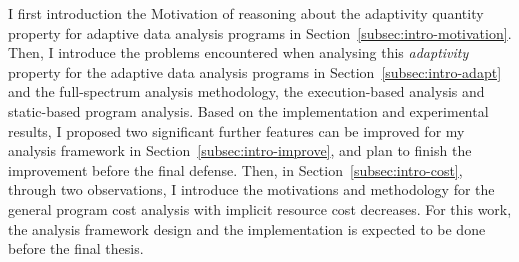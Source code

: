 I first introduction the Motivation of reasoning about the adaptivity quantity property for adaptive data analysis programs in Section~\ref{subsec:intro-motivation}.
Then, I introduce the problems encountered when analysing this \emph{adaptivity} property for the adaptive data analysis programs in Section~\ref{subsec:intro-adapt}
and the full-spectrum analysis methodology, the execution-based analysis and static-based program analysis.
%
Based on the implementation and experimental results, I proposed two significant 
further features can be improved for my analysis framework in Section~\ref{subsec:intro-improve}, and plan to finish the improvement 
before the final defense.
%
   Then, in Section~\ref{subsec:intro-cost}, through two observations, I introduce the motivations and methodology
   for the general program cost analysis with implicit resource cost decreases.
   For this work, the analysis framework design and the implementation is expected to be done  before the final thesis.
